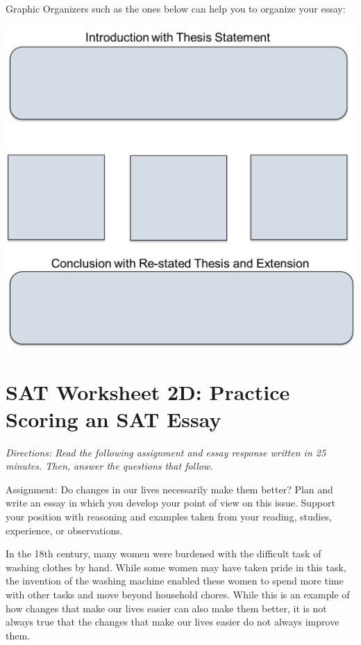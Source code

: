 \newpage
Graphic Organizers such as the ones below can help you to organize your essay:

\includegraphics[width=\textwidth]{Organizer}

\section[Scoring]{SAT Worksheet 2D: Practice Scoring an SAT Essay}
\textit{Directions: Read the following assignment and essay response written in 25 minutes. Then, answer the questions that follow.}

\bigskip
Assignment: Do changes in our lives necessarily make them better? Plan and write an essay in which you develop your point of view on this issue.  Support your position with reasoning and examples taken from your reading, studies, experience, or observations.

\bigskip
\indent In the 18th century, many women were burdened with the difficult task of washing clothes by hand. While some women may have taken pride in this task, the invention of the washing machine enabled these women to spend more time with other tasks and move beyond household chores. While this is an example of how changes that make our lives easier can also make them better, it is not always true that the changes that make our lives easier do not always improve them.\\

